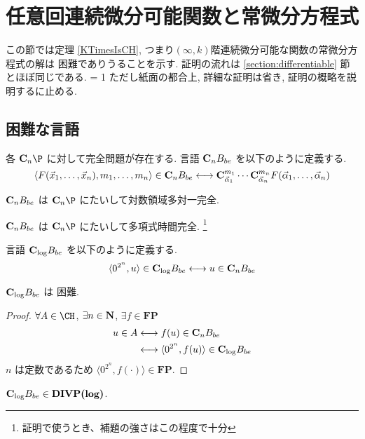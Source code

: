 \section{任意回連続微分可能関数と常微分方程式}

この節では定理 \ref{KTimesIsCH}, 
つまり$(\infty, k)$階連続微分可能な関数の常微分方程式の解は
\DIVPlog 困難でありうることを示す.
証明の流れは \ref{section:differentiable} 節とほぼ同じである.
\ifnum \proc = 1
ただし紙面の都合上, 詳細な証明は省き, 証明の概略を説明するに止める.
\fi


\subsection{\CH 困難な言語}

各 $\C_n \P$ に対して完全問題が存在する.
言語 ${\bf C}_n B_{be}$ を以下のように定義する.
\[
 \langle F(\vec x_1, \dots, \vec x_n), m_1, \dots, m_n \rangle \in {\bf C}_n B_{be}
 \longleftrightarrow
 {\bf C}^{m_1}_{\vec \alpha_1} \cdots {\bf C}^{m_n}_{\vec \alpha_n} F(\vec \alpha_1, \dots, \vec \alpha_n) 
\]

\begin{lemma}
 ${\bf C}_n B_{be}$ は $\C_n\P$ にたいして対数領域多対一完全.
\end{lemma}

\begin{lemma}
 ${\bf C}_n B_{be}$ は $\C_n\P$ にたいして多項式時間完全.
 \footnote{証明で使うとき、補題の強さはこの程度で十分}
\end{lemma}

言語 ${\bf C}_{\log} B_{be}$ を以下のように定義する.
\[
 \langle 0^{2^n}, u \rangle \in {\bf C}_{\log} B_{be}
 \longleftrightarrow
 u \in {\bf C}_n B_{be}
\]

\begin{lemma}
 ${\bf C}_{\log} B_{be}$ は \CH 困難.
\end{lemma}

\begin{proof}
 $\forall A \in \CH$, $\exists n \in \mathbf N$, $\exists f \in \mathbf{FP}$
 \begin{align}
  u \in A 
  & \longleftrightarrow f(u) \in {\bf C}_n B_{be}\\
  & \longleftrightarrow \langle 0^{2^n}, f(u) \rangle \in {\bf C}_{\log} B_{be}
 \end{align}
 $n$ は定数であるため $\langle 0^{2^n}, f(\cdot) \rangle \in \mathbf{FP}$.
\end{proof}

\begin{lemma}
 ${\bf C}_{\log} B_{be} \in \text{\bf DIVP(log)}$.
\end{lemma}


